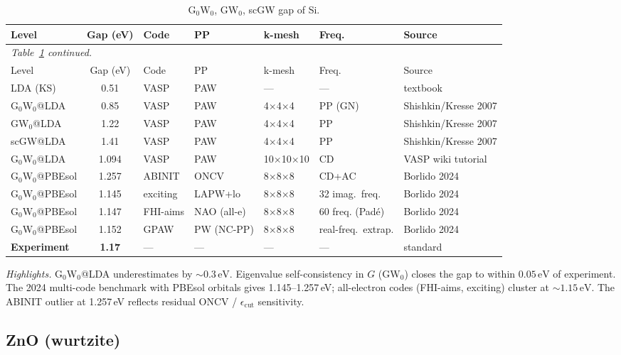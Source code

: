 \documentclass[11pt]{article}
\newcommand{\eV}{\ensuremath{\,\mathrm{eV}}}
\newcommand{\target}[1]{\textbf{\textcolor{blue!60!black}{#1}}}
\begin{document}
\begin{longtable}{p{3.0cm} c l l l l p{3.5cm}}
\caption{G$_0$W$_0$, GW$_0$, scGW gap of Si.} \label{tab:si_gw} \\
\toprule
Level & Gap (eV) & Code & PP & k-mesh & Freq. & Source \\
\midrule
\endfirsthead
\multicolumn{7}{l}{\emph{Table~\ref{tab:si_gw} continued.}} \\
\toprule
Level & Gap (eV) & Code & PP & k-mesh & Freq. & Source \\
\midrule
\endhead
LDA (KS)         & 0.51  & VASP    & PAW       & ---     & ---       & textbook \\
G$_0$W$_0$@LDA   & 0.85  & VASP    & PAW       & 4$\times$4$\times$4 & PP (GN) & Shishkin/Kresse 2007 \\
GW$_0$@LDA       & 1.22  & VASP    & PAW       & 4$\times$4$\times$4 & PP    & Shishkin/Kresse 2007 \\
scGW@LDA         & 1.41  & VASP    & PAW       & 4$\times$4$\times$4 & PP    & Shishkin/Kresse 2007 \\
G$_0$W$_0$@LDA   & 1.094 & VASP    & PAW       & 10$\times$10$\times$10 & CD & VASP wiki tutorial \\
G$_0$W$_0$@PBEsol& 1.257 & ABINIT  & ONCV      & 8$\times$8$\times$8 & CD+AC & Borlido 2024 \\
G$_0$W$_0$@PBEsol& 1.145 & exciting& LAPW+lo   & 8$\times$8$\times$8 & 32 imag.\ freq. & Borlido 2024 \\
G$_0$W$_0$@PBEsol& 1.147 & FHI-aims& NAO (all-e)& 8$\times$8$\times$8 & 60 freq. (Pad\'e) & Borlido 2024 \\
G$_0$W$_0$@PBEsol& 1.152 & GPAW    & PW (NC-PP)& 8$\times$8$\times$8 & real-freq.\ extrap.& Borlido 2024 \\
\target{Experiment} & \target{1.17} & --- & --- & --- & --- & standard \\
\bottomrule
\end{longtable}

\noindent \emph{Highlights.}
G$_0$W$_0$@LDA underestimates by $\sim 0.3\eV$. Eigenvalue self-consistency
in $G$ (GW$_0$) closes the gap to within $0.05\eV$ of experiment. The
2024 multi-code benchmark with PBEsol orbitals gives 1.145--1.257\,eV;
all-electron codes (FHI-aims, exciting) cluster at $\sim 1.15\eV$. The
ABINIT outlier at 1.257\,eV reflects residual ONCV / $\epsilon_{\mathrm{cut}}$
sensitivity.

\subsection{ZnO (wurtzite)}
\end{document}
